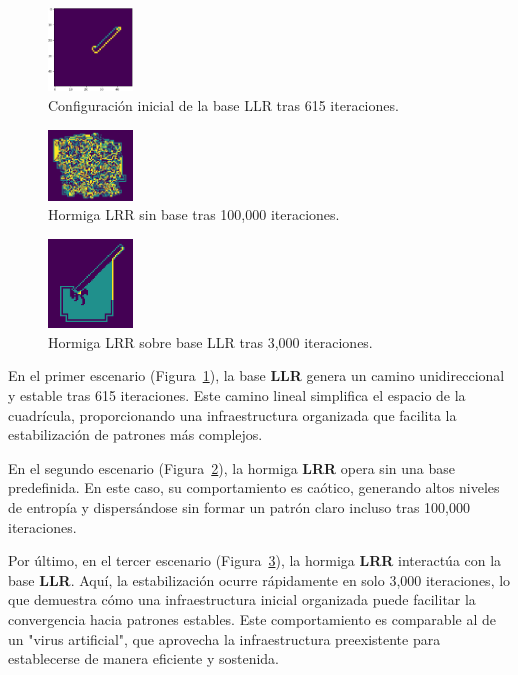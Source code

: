 \documentclass[twocolumn]{article}
\begin{document}
    \begin{figure}[h!]
        \includegraphics[width=0.2\textwidth]{reportTemplate/figures/llr.png}
        \caption{Configuración inicial de la base LLR tras 615 iteraciones.}
        \label{fig:llr_615}
    \end{figure}
    \hfill
    \begin{figure}[h!]
        \includegraphics[width=0.2\textwidth]{reportTemplate/figures/lrr_sin_base.png}
        \caption{Hormiga LRR sin base tras 100,000 iteraciones.}
        \label{fig:lrr_no_base}
    \end{figure}
    \hfill
    \begin{figure}[h!]
        \includegraphics[width=0.2\textwidth]{reportTemplate/figures/lrr_con_base.png}
        \caption{Hormiga LRR sobre base LLR tras 3,000 iteraciones.}
        \label{fig:lrr_base_llr}
    \end{figure}


En el primer escenario (Figura~\ref{fig:llr_615}), la base \textbf{LLR} genera un camino unidireccional y estable tras 615 iteraciones. Este camino lineal simplifica el espacio de la cuadrícula, proporcionando una infraestructura organizada que facilita la estabilización de patrones más complejos.

En el segundo escenario (Figura~\ref{fig:lrr_no_base}), la hormiga \textbf{LRR} opera sin una base predefinida. En este caso, su comportamiento es caótico, generando altos niveles de entropía y dispersándose sin formar un patrón claro incluso tras 100,000 iteraciones.

Por último, en el tercer escenario (Figura~\ref{fig:lrr_base_llr}), la hormiga \textbf{LRR} interactúa con la base \textbf{LLR}. Aquí, la estabilización ocurre rápidamente en solo 3,000 iteraciones, lo que demuestra cómo una infraestructura inicial organizada puede facilitar la convergencia hacia patrones estables. Este comportamiento es comparable al de un "virus artificial", que aprovecha la infraestructura preexistente para establecerse de manera eficiente y sostenida.
\end{document}
